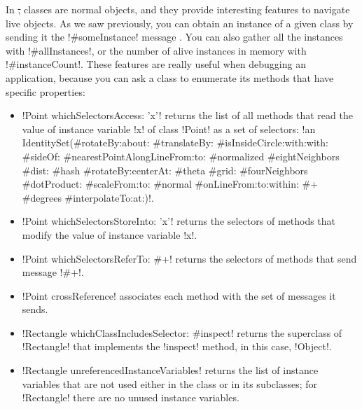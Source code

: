 \documentclass[a4paper,10pt,twoside]{book}
\begin{document}
In \st, classes are normal objects, and they provide interesting features to navigate live objects.
As we saw previously, you can obtain an instance of a given class by sending it the \ct!#someInstance! message .
You can also gather all the instances with \ct!#allInstances!, or the number of alive instances in memory with \ct!#instanceCount!.
These features are really useful when debugging an application, because you can ask a class to enumerate its methods that have specific properties:
\begin{itemize}
	\item \ct!Point whichSelectorsAccess: 'x'! returns the list of all methods that read the value of instance variable \ct!x! of class \ct!Point! as a set of selectors: \ct!an IdentitySet(#rotateBy:about: #translateBy: #isInsideCircle:with:with: #sideOf: #nearestPointAlongLineFrom:to: #normalized #eightNeighbors #dist: #hash #rotateBy:centerAt: #theta #grid: #fourNeighbors #dotProduct: #scaleFrom:to: #normal #onLineFrom:to:within: #+ #degrees #interpolateTo:at:)!.
	\item \ct!Point whichSelectorsStoreInto: 'x'! returns the selectors of methods that modify the value of instance variable \ct!x!.
	\item \ct!Point whichSelectorsReferTo: #+! returns the selectors of methods that send message \ct!#+!.
	\item \ct!Point crossReference! associates each method with the set of messages it sends.
	\item \ct!Rectangle whichClassIncludesSelector: #inspect! returns the superclass of \ct!Rectangle! that implements the \ct!inspect! method, in this case, \ct!Object!.
	\item \ct!Rectangle unreferencedInstanceVariables! returns the list of instance variables that are not used either in the class or in its subclasses; for \ct!Rectangle! there are no unused instance variables.
\end{itemize}
\end{document}
